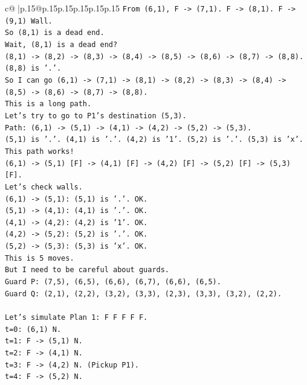 \documentclass{article}
\begin{document}
{\begin{supertabular}{c@{$\;$}|p{.15\linewidth}@{}p{.15\linewidth}p{.15\linewidth}p{.15\linewidth}p{.15\linewidth}p{.15\linewidth}}
{{{\texttt{From (6,1), F {-}> (7,1). F {-}> (8,1). F {-}> (9,1) Wall.} \\
\texttt{So (8,1) is a dead end.} \\
\texttt{Wait, (8,1) is a dead end?} \\
\texttt{(8,1) {-}> (8,2) {-}> (8,3) {-}> (8,4) {-}> (8,5) {-}> (8,6) {-}> (8,7) {-}> (8,8).} \\
\texttt{(8,8) is '.'.} \\
\texttt{So I can go (6,1) {-}> (7,1) {-}> (8,1) {-}> (8,2) {-}> (8,3) {-}> (8,4) {-}> (8,5) {-}> (8,6) {-}> (8,7) {-}> (8,8).} \\
\texttt{This is a long path.} \\
\texttt{Let's try to go to P1's destination (5,3).} \\
\texttt{Path: (6,1) {-}> (5,1) {-}> (4,1) {-}> (4,2) {-}> (5,2) {-}> (5,3).} \\
\texttt{(5,1) is '.'. (4,1) is '.'. (4,2) is '1'. (5,2) is '.'. (5,3) is 'x'.} \\
\texttt{This path works!} \\
\texttt{(6,1) {-}> (5,1) {[}F{]} {-}> (4,1) {[}F{]} {-}> (4,2) {[}F{]} {-}> (5,2) {[}F{]} {-}> (5,3) {[}F{]}.} \\
\texttt{Let's check walls.} \\
\texttt{(6,1) {-}> (5,1): (5,1) is '.'. OK.} \\
\texttt{(5,1) {-}> (4,1): (4,1) is '.'. OK.} \\
\texttt{(4,1) {-}> (4,2): (4,2) is '1'. OK.} \\
\texttt{(4,2) {-}> (5,2): (5,2) is '.'. OK.} \\
\texttt{(5,2) {-}> (5,3): (5,3) is 'x'. OK.} \\
\texttt{This is 5 moves.} \\
\texttt{But I need to be careful about guards.} \\
\texttt{Guard P: (7,5), (6,5), (6,6), (6,7), (6,6), (6,5).} \\
\texttt{Guard Q: (2,1), (2,2), (3,2), (3,3), (2,3), (3,3), (3,2), (2,2).} \\
\\ 
\texttt{Let's simulate Plan 1: F F F F F.} \\
\texttt{t=0: (6,1) N.} \\
\texttt{t=1: F {-}> (5,1) N.} \\
\texttt{t=2: F {-}> (4,1) N.} \\
\texttt{t=3: F {-}> (4,2) N. (Pickup P1).} \\
\texttt{t=4: F {-}> (5,2) N.} \\
}}}
\end{supertabular}}
\end{document}
